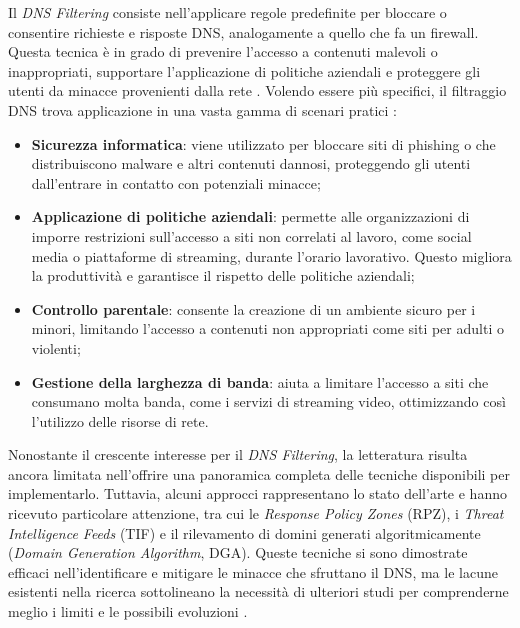 Il \textit{DNS Filtering} consiste nell'applicare regole predefinite per bloccare o consentire richieste e risposte DNS, analogamente a quello che fa un firewall. Questa tecnica è in grado di prevenire l'accesso a contenuti malevoli o inappropriati, supportare l'applicazione di politiche aziendali e proteggere gli utenti da minacce provenienti dalla rete \cite{Magnusson2024}. Volendo essere più specifici, il filtraggio DNS trova applicazione in una vasta gamma di scenari pratici \cite{Murdoch2008, Varadharajan2010}:
\begin{itemize}
  \item \textbf{Sicurezza informatica}: viene utilizzato per bloccare siti di phishing o che distribuiscono malware e altri contenuti dannosi, proteggendo gli utenti dall'entrare in contatto con  potenziali minacce;

  \item \textbf{Applicazione di politiche aziendali}: permette alle organizzazioni di imporre restrizioni sull'accesso a siti non correlati al lavoro, come social media o piattaforme di streaming, durante l'orario lavorativo. Questo migliora la produttività e garantisce il rispetto delle politiche aziendali;

  \item \textbf{Controllo parentale}: consente la creazione di un ambiente sicuro per i minori, limitando l'accesso a contenuti non appropriati come siti per adulti o violenti;

  \item \textbf{Gestione della larghezza di banda}: aiuta a limitare l'accesso a siti che consumano molta banda, come i servizi di streaming video, ottimizzando così l'utilizzo delle risorse di rete.
\end{itemize}

Nonostante il crescente interesse per il \textit{DNS Filtering}, la letteratura risulta ancora limitata nell'offrire una panoramica completa delle tecniche disponibili per implementarlo. Tuttavia, alcuni approcci rappresentano lo stato dell'arte e hanno ricevuto particolare attenzione, tra cui le \textit{Response Policy Zones} (RPZ), i \textit{Threat Intelligence Feeds} (TIF) e il rilevamento di domini generati algoritmicamente (\textit{Domain Generation Algorithm}, DGA). Queste tecniche si sono dimostrate efficaci nell'identificare e mitigare le minacce che sfruttano il DNS, ma le lacune esistenti nella ricerca sottolineano la necessità di ulteriori studi per comprenderne meglio i limiti e le possibili evoluzioni \cite{Magnusson2024}.

